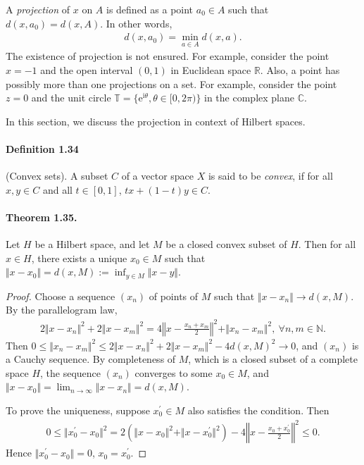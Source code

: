 \documentclass{article}
\renewcommand{\i}{\mathrm{i}}
\begin{document}
A \textit{projection} of $x$ on $A$ is defined as a point $a_0\in A$ such that $d(x,a_0)=d(x,A)$. In other words,
\begin{align*}
	d(x,a_0) = \min_{a\in A}d(x,a).
\end{align*}
The existence of projection is not ensured. For example, consider the point $x=-1$ and the open interval $(0,1)$ in Euclidean space $\mathbb{R}$. Also, a point has possibly more than one projections on a set. For example, consider the point $z=0$ and the unit circle $\mathbb{T}=\{\mathrm{e}^{\i\theta},\theta\in[0,2\pi)\}$ in the complex plane $\mathbb{C}$.

In this section, we discuss the projection in context of Hilbert spaces.

\paragraph{Definition 1.34\label{def:1.34}} (Convex sets). A subset $C$ of a vector space $X$ is said to be \textit{convex}, if for all $x,y\in C$ and all $t\in[0,1]$, $tx+(1-t)y\in C$.

\paragraph{Theorem 1.35.\label{thm:1.35}} Let $H$ be a Hilbert space, and let $M$ be a closed convex subset of $H$. Then for all $x\in H$, there exists a unique $x_0\in M$ such that $\Vert x-x_0\Vert=d(x,M):=\inf_{y\in M}\Vert x-y\Vert$.
\begin{proof}
Choose a sequence $(x_n)$ of points of $M$ such that $\Vert x-x_n\Vert\to d(x,M)$. By the parallelogram law,
\begin{align*}
	2\Vert x-x_n\Vert^2 + 2\Vert x - x_m\Vert^2 = 4\left\Vert x-\frac{x_n+x_m}{2}\right\Vert^2 + \Vert x_n - x_m\Vert^2,\ \forall n,m\in\mathbb{N}.
\end{align*}
Then $0\leq\Vert x_n - x_m\Vert^2 \leq 2\Vert x-x_n\Vert^2 + 2\Vert x-x_m\Vert^2 - 4d(x,M)^2 \to 0$, and $(x_n)$ is a Cauchy sequence. By completeness of $M$, which is a closed subset of a complete space $H$, the sequence $(x_n)$ converges to some $x_0\in M$, and $\Vert x-x_0\Vert = \lim_{n\to\infty}\Vert x-x_n\Vert = d(x,M)$.

To prove the uniqueness, suppose $x^\prime_0\in M$ also satisfies the condition. Then
\begin{align*}
	0\leq \Vert x^\prime_0 - x_0\Vert^2 = 2\left(\Vert x-x_0\Vert^2 + \Vert x-x_0^\prime\Vert^2\right) - 4\left\Vert x-\frac{x_0+x_0^\prime}{2}\right\Vert^2 \leq 0.
\end{align*}
Hence $\Vert x^\prime_0 - x_0\Vert=0$, $x_0=x_0^\prime$.
\end{proof}
\end{document}

